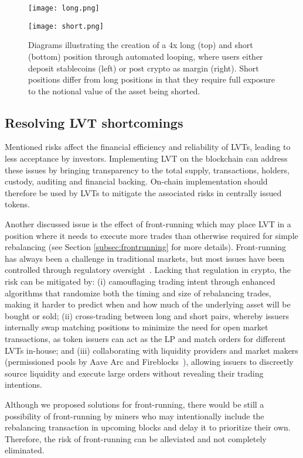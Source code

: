 \begin{figure}[p]
	\centering
	\texttt{[image: long.png]}
	\caption{Diagrams illustrating the creation of a 4x long (top) and short (bottom) position through automated looping, where users either deposit stablecoins (left) or post crypto as margin (right). Short positions differ from long positions in that they require full exposure to the notional value of the asset being shorted.}
	\centering
	\texttt{[image: short.png]}
	\label{fig:looping}
\end{figure}

\subsection{Resolving LVT shortcomings}\label{subsec:resolve}
Mentioned risks affect the financial efficiency and reliability of LVTs, leading to less acceptance by investors. Implementing LVT on the blockchain can address these issues by bringing transparency to the total supply, transactions, holders, custody, auditing and financial backing. On-chain implementation should therefore be used by LVTs to mitigate the associated risks in centrally issued tokens.

Another discussed issue is the effect of front-running which may place LVT in a position where it needs to execute more trades than otherwise required for simple rebalancing (see Section \ref{subsec:frontrunning} for more details). Front-running has always been a challenge in traditional markets, but most issues have been controlled through regulatory oversight~\cite{SEC_Oversight}. Lacking that regulation in crypto, the risk can be mitigated by: (i) camouflaging trading intent through enhanced algorithms that randomize both the timing and size of rebalancing trades, making it harder to predict when and how much of the underlying asset will be bought or sold; (ii) cross-trading between long and short pairs, whereby issuers internally swap matching positions to minimize the need for open market transactions, as token issuers can act as the LP and match orders for different LVTs in-house; and (iii) collaborating with liquidity providers and market makers (\eg permissioned pools by Aave Arc and Fireblocks~\cite{Aave_Arc}), allowing issuers to discreetly source liquidity and execute large orders without revealing their trading intentions.

Although we proposed solutions for front-running, there would be still a possibility of front-running by miners who may intentionally include the rebalancing transaction in upcoming blocks and delay it to prioritize their own. Therefore, the risk of front-running can be alleviated and not completely eliminated.

